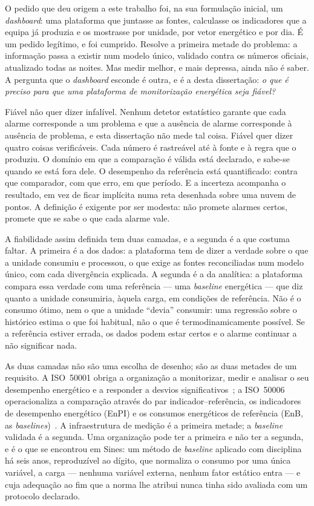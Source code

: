 O pedido que deu origem a este trabalho foi, na sua formulação inicial,
um \emph{dashboard}: uma plataforma que juntasse as fontes, calculasse
os indicadores que a equipa já produzia e os mostrasse por unidade, por
vetor energético e por dia. É um pedido legítimo, e foi cumprido. Resolve
a primeira metade do problema: a informação passa a existir num modelo
único, validado contra os números oficiais, atualizado todas as noites.
Mas medir melhor, e mais depressa, ainda não é saber. A pergunta que o
\emph{dashboard} esconde é outra, e é a desta dissertação: \emph{o que é
preciso para que uma plataforma de monitorização energética seja
fiável?}

Fiável não quer dizer infalível. Nenhum detetor estatístico garante que
cada alarme corresponde a um problema e que a ausência de alarme
corresponde à ausência de problema, e esta dissertação não mede tal
coisa. Fiável quer dizer quatro coisas verificáveis. Cada número é
rastreável até à fonte e à regra que o produziu. O domínio em que a
comparação é válida está declarado, e sabe-se quando se está fora dele. O
desempenho da referência está quantificado: contra que comparador, com
que erro, em que período. E a incerteza acompanha o resultado, em vez de
ficar implícita numa reta desenhada sobre uma nuvem de pontos. A
definição é exigente por ser modesta: não promete alarmes certos, promete
que se sabe o que cada alarme vale.

A fiabilidade assim definida tem duas camadas, e a segunda é a que
costuma faltar. A primeira é a dos dados: a plataforma tem de dizer a
verdade sobre o que a unidade consumiu e processou, o que exige as fontes
reconciliadas num modelo único, com cada divergência explicada. A segunda
é a da analítica: a plataforma compara essa verdade com uma referência
--- uma \emph{baseline} energética --- que diz quanto a unidade
consumiria, àquela carga, em condições de referência. Não é o consumo
ótimo, nem o que a unidade \enquote{devia} consumir: uma regressão sobre
o histórico estima o que foi habitual, não o que é termodinamicamente
possível. Se a referência estiver errada, os dados podem estar certos e o
alarme continuar a não significar nada.

As duas camadas não são uma escolha de desenho; são as duas metades de
um requisito. A ISO~50001 obriga a organização a monitorizar, medir e
analisar o seu desempenho energético e a responder a desvios
significativos~\cite[\S9.1]{ISO50001_2018}; a ISO~50006 operacionaliza a
comparação através do par indicador--referência, os indicadores de
desempenho energético (EnPI) e os consumos energéticos de referência
(EnB, as \emph{baselines})~\cite{ISO50006_2014}. A infraestrutura de
medição é a primeira metade; a \emph{baseline} validada é a segunda. Uma
organização pode ter a primeira e não ter a segunda, e é o que se
encontrou em Sines: um método de \emph{baseline} aplicado com disciplina
há seis anos, reproduzível ao dígito, que normaliza o consumo por uma
única variável, a carga --- nenhuma variável externa, nenhum fator
estático entra --- e cuja adequação ao fim que a norma lhe atribui nunca
tinha sido avaliada com um protocolo declarado.

